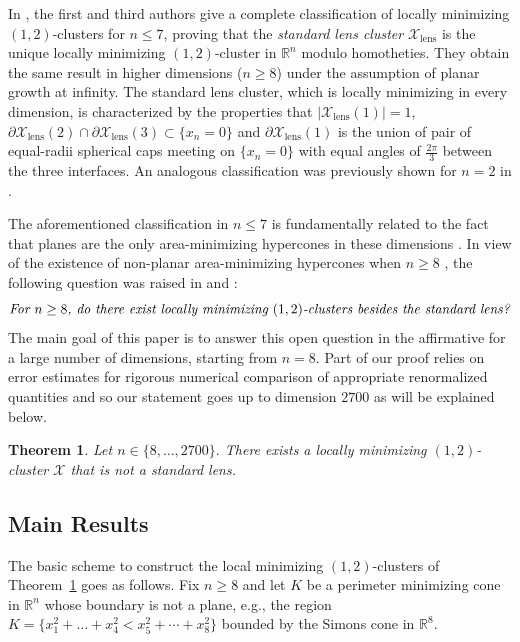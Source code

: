 \documentclass[10pt,reqno]{amsart}
\numberwithin{equation}{section}
\newtheorem{theorem}{Theorem}[section]
\theoremstyle{definition}
\newcommand{\R}{\mathbb{R}}
\DeclareMathOperator{\lens}{lens}
\newcommand{\X}{\mathcal{X}}
\begin{document}
\medskip

%

In \cite{BroNov24}, the first and third authors give a complete classification of  locally minimizing   $(1,2)$-clusters for $n\leq 7$, proving that the \emph{standard lens cluster} $\X_{\lens}$ is the unique locally minimizing $(1,2)$-cluster in $\R^n$ modulo homotheties. They obtain the same result in higher dimensions ($n\ge 8$) under the assumption of planar growth at infinity. The standard lens cluster, which is locally minimizing in every dimension, is characterized by the properties that {$|\X_{\lens}(1)|=1$},  $\partial\X_{ {\lens}}(2)\cap \partial\X_{{\lens}}(3) \subset \{x_n=0\}$ and $\partial \X_{ {\lens}}(1)$ is the union of pair of equal-radii spherical caps meeting on $\{x_n=0\}$ with equal angles of $\frac{2\pi}{3}$ between the three interfaces. An analogous classification was previously shown for $n=2$  in \cite{AlaBroVri23}.\medskip


The aforementioned classification in $n\leq 7$ is fundamentally related to the fact that planes are the only area-minimizing hypercones in these dimensions \cite{Simons}. In view of the existence of non-planar area-minimizing hypercones when $n \geq 8$ \cite{BDGG}, the following question was raised in \cite{BroNov24} and \cite{NovPaoTor23}:
\[
\mbox{\it For $n\geq 8$, do there exist locally minimizing $(1,2)$-clusters besides the standard lens?}
\]
The main goal of this paper is to answer this open question in the affirmative for a large number of dimensions, starting from $n=8$. 
{Part of our proof relies on error estimates for rigorous numerical comparison of appropriate renormalized quantities and so our statement goes up to dimension $2700$ as will be explained below.
}


\begin{theorem}\label{thm: summary}
    Let $n \in \{ 8, \dots, 2700\}.$ There exists a locally minimizing $(1,2)$-cluster $\X$ that is not a standard lens.
\end{theorem}



\subsection{Main Results}
The basic scheme to construct the local minimizing $(1,2)$-clusters of Theorem~\ref{thm: summary} goes as follows. Fix $n\geq 8$ and let $K$ be a perimeter minimizing cone in $\R^n$ whose boundary is not a plane, e.g., the region $K = \{ x_1^2 +\dots +x_4^2 < x_5^2 + \cdots + x_8^2\}$  bounded by the Simons cone in $\R^8.$\medskip
\end{document}
